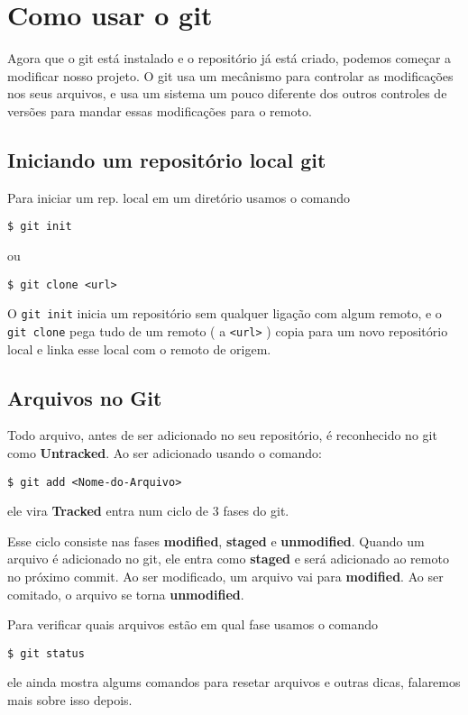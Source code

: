 \documentclass{article}
\begin{document}
\section{Como usar o git}
	Agora que o git está instalado e o repositório já está criado, podemos
começar a modificar nosso projeto. O git usa um mecânismo para controlar as
modificações nos seus arquivos, e usa um sistema um pouco diferente dos outros
controles de versões para mandar essas modificações para o remoto.

\subsection{Iniciando um repositório local git}
    Para iniciar um rep. local em um diretório usamos o comando
\begin{tabbing}
    \hspace{1cm}\=\verb#$ git init#
\end{tabbing}
ou
\begin{tabbing}
    \hspace{1cm}\=\verb#$ git clone <url>#
\end{tabbing}

    O \verb#git init# inicia um repositório sem qualquer ligação com algum remoto,
e o \verb#git clone# pega tudo de um remoto ( a \verb#<url># ) copia para um novo repositório
local e linka esse local com o remoto de origem.

\subsection{Arquivos no Git}
    Todo arquivo, antes de ser adicionado no seu repositório, é reconhecido no git
como \textbf{Untracked}. Ao ser adicionado usando o comando:
\begin{tabbing}
    \hspace{1cm}\=\verb#$ git add <Nome-do-Arquivo>#\\
\end{tabbing}
ele vira \textbf{Tracked} entra num ciclo de 3 fases do git.

    Esse ciclo consiste nas fases \textbf{modified}, \textbf{staged} e 
\textbf{unmodified}. Quando um arquivo é adicionado no git, ele entra como 
\textbf{staged} e será adicionado ao remoto no próximo commit. Ao ser modificado,
um arquivo vai para \textbf{modified}. Ao ser comitado, o arquivo se torna 
\textbf{unmodified}.
    
    Para verificar quais arquivos estão em qual fase usamos o comando    
\begin{tabbing}
    \hspace{1cm}\=\verb#$ git status#
\end{tabbing}
    ele ainda mostra algums comandos para resetar arquivos e outras dicas, falaremos
mais sobre isso depois.
    
\end{document}
